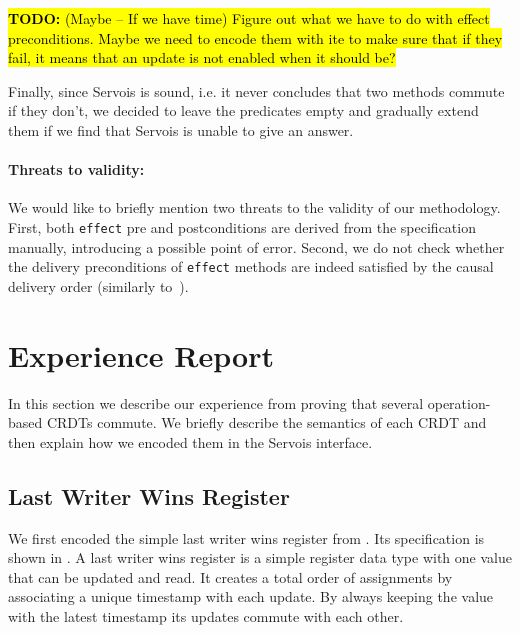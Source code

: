 \documentclass{article}
\newcommand{\TODO}[1]{\hl{\textbf{TODO:} #1}\xspace}
\begin{document}
\TODO{(Maybe -- If we have time) Figure out what we have to do with
  effect preconditions. Maybe we need to encode them with ite to make
  sure that if they fail, it means that an update is not enabled when
  it should be?}


Finally, since Servois is sound, i.e. it never concludes that two
methods commute if they don't, we decided to leave the predicates
empty and gradually extend them if we find that Servois is unable to
give an answer.

\paragraph{Threats to validity:} 

We would like to briefly mention two threats to the validity of our
methodology. First, both \texttt{effect} pre and postconditions are
derived from the specification manually, introducing a possible point
of error. Second, we do not check whether the delivery preconditions
of \texttt{effect} methods are indeed satisfied by the causal delivery
order (similarly to~\cite{shapiro2011conflict}).


\section{Experience Report}

In this section we describe our experience from proving that several
operation-based CRDTs commute. We briefly describe the semantics of
each CRDT and then explain how we encoded them in the Servois
interface.

\subsection{Last Writer Wins Register}

We first encoded the simple last writer wins register from
\cite{shapiro2011comprehensive}. Its specification is shown in
. A last writer wins register is a simple register
data type with one value that can be updated and read. It creates a
total order of assignments by associating a unique timestamp with each
update. By always keeping the value with the latest timestamp its
updates commute with each other.
\end{document}
